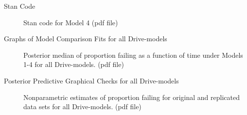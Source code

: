 \documentclass[12pt]{article}
\begin{document}
\begin{description}

\item[Stan Code] Stan code for Model 4 (pdf file)

\item[Graphs of Model Comparison Fits for all Drive-models] Posterior median of proportion failing as a function of time under Models 1-4 for all Drive-models. (pdf file)

\item[Posterior Predictive Graphical Checks for all Drive-models] Nonparametric estimates of proportion failing for original and replicated data sets for all Drive-models. (pdf file)

\end{description}



\end{document}

